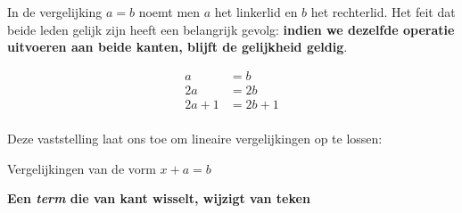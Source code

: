 \documentclass{ximera}
\begin{document}
	\author{Wiskunde Op Maat}

   
In de vergelijking \( a = b \) noemt men \(a \) het linkerlid en \(b\) het rechterlid. 
Het feit dat beide leden gelijk zijn heeft een belangrijk gevolg: \textbf{indien we dezelfde operatie uitvoeren aan beide kanten, blijft de gelijkheid geldig}. 


\begin{align*}
       a  & = b\\
       2a    & = 2b \\
    2a +1  & = 2b + 1\\
\end{align*}

Deze vaststelling laat ons toe om lineaire vergelijkingen op te lossen: 

\begin{proposition} Vergelijkingen van de vorm \(x + a = b\)
  
  \textbf{Een \textit{term} die van kant wisselt, wijzigt van teken}


 
 

\end{proposition}
\end{document}
